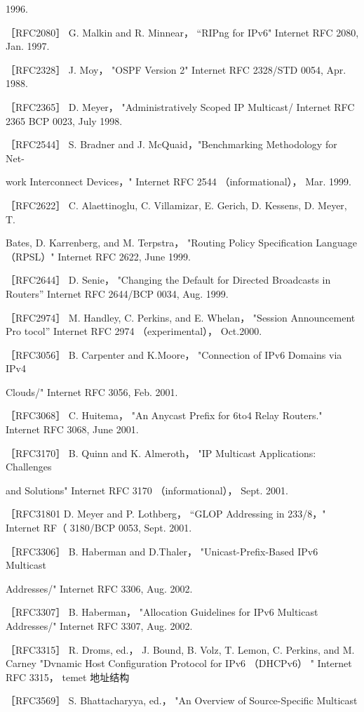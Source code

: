 1996.

［RFC2080］ G. Malkin and R. Minnear， “RIPng for IPv6" Internet RFC 2080, Jan.
1997.

［RFC2328］ J. Moy， "OSPF Version 2" Internet RFC 2328/STD 0054, Apr. 1988.

［RFC2365］ D. Meyer， "Administratively Scoped IP Multicast/ Internet RFC 2365
BCP 0023, July 1998.

［RFC2544］ S. Bradner and J. McQuaid，"Benchmarking Methodology for Net-

work Interconnect Devices，" Internet RFC 2544 （informational）， Mar. 1999.

［RFC2622］ C. Alaettinoglu, C. Villamizar, E. Gerich, D. Kessens, D. Meyer, T.

Bates, D. Karrenberg, and M. Terpstra， "Routing Policy Specification Language
（RPSL）" Internet RFC 2622, June 1999.

［RFC2644］ D. Senie， "Changing the Default for Directed Broadcasts in Routers”
Internet RFC 2644/BCP 0034, Aug. 1999.

［RFC2974］ M. Handley, C. Perkins, and E. Whelan， "Session Announcement Pro
tocol” Internet RFC 2974 （experimental）， Oct.2000.

［RFC3056］ B. Carpenter and K.Moore， "Connection of IPv6 Domains via IPv4

Clouds/" Internet RFC 3056, Feb. 2001.

［RFC3068］ C. Huitema， "An Anycast Prefix for 6to4 Relay Routers." Internet RFC
3068, June 2001.

［RFC3170］ B. Quinn and K. Almeroth， "IP Multicast Applications: Challenges

and Solutions" Internet RFC 3170 （informational）， Sept. 2001.

［RFC31801 D. Meyer and P. Lothberg， “GLOP Addressing in 233/8，" Internet RF（
3180/BCP 0053, Sept. 2001.

［RFC3306］ B. Haberman and D.Thaler， "Unicast-Prefix-Based IPv6 Multicast

Addresses/" Internet RFC 3306, Aug. 2002.

［RFC3307］ B. Haberman， "Allocation Guidelines for IPv6 Multicast Addresses/"
Internet RFC 3307, Aug. 2002.

［RFC3315］ R. Droms, ed.， J. Bound, B. Volz, T. Lemon, C. Perkins, and M. Carney
"Dvnamic Host Configuration Protocol for IPv6 （DHCPv6） " Internet RFC 3315，
temet 地址结构

［RFC3569］ S. Bhattacharyya, ed.， "An Overview of Source-Specific Multicast

